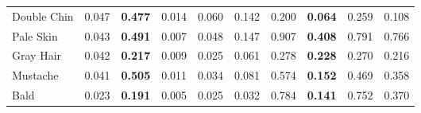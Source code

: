 \begin{tabular}{lrllrrllrr}
 Double Chin         & 0.047 & \bf 0.477 & 0.014     & 0.060 & 0.142 & 0.200     & \bf 0.064 & 0.259 & 0.108 \\
 Pale Skin           & 0.043 & \bf 0.491 & 0.007     & 0.048 & 0.147 & 0.907     & \bf 0.408 & 0.791 & 0.766 \\
 Gray Hair           & 0.042 & \bf 0.217 & 0.009     & 0.025 & 0.061 & 0.278     & \bf 0.228 & 0.270 & 0.216 \\
 Mustache            & 0.041 & \bf 0.505 & 0.011     & 0.034 & 0.081 & 0.574     & \bf 0.152 & 0.469 & 0.358 \\
 Bald                & 0.023 & \bf 0.191 & 0.005     & 0.025 & 0.032 & 0.784     & \bf 0.141 & 0.752 & 0.370 \\
\hline
\end{tabular}
